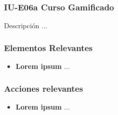 
\subsubsection{IU-E06a Curso Gamificado}

 Descripción ...


\subsubsection{Elementos Relevantes}

    \begin{itemize}
    \item {\bf Lorem ipsum}
        ...
    \end{itemize}

\subsubsection{Acciones relevantes}

    \begin{itemize}
    \item {\bf Lorem ipsum}
        ...
    \end{itemize}

\clearpage
